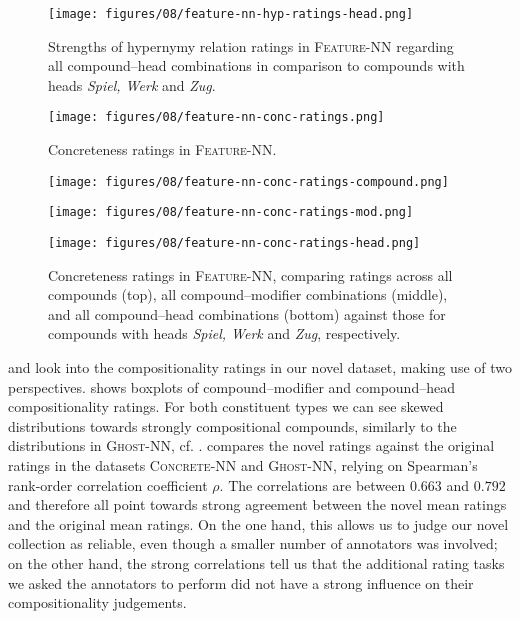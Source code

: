 \documentclass[output=paper,colorlinks,citecolor=brown]{langscibook}
\begin{document}
\begin{figure}[p]
    \centering
    \texttt{[image: figures/08/feature-nn-hyp-ratings-head.png]}
    \caption{Strengths of hypernymy relation ratings in \textsc{Feature-NN} regarding all compound--head combinations in comparison to compounds with heads \textit{Spiel, Werk} and \textit{Zug}.}
    \label{fig:feature-nn-ratings-hyp}
\end{figure}

\begin{figure}[p]
    \centering
    \texttt{[image: figures/08/feature-nn-conc-ratings.png]}
    \caption{Concreteness ratings in \textsc{Feature-NN}.}
    \label{fig:feature-nn-ratings-conc}
\end{figure}

\begin{figure}
    \centering
    \texttt{[image: figures/08/feature-nn-conc-ratings-compound.png]}

    \texttt{[image: figures/08/feature-nn-conc-ratings-mod.png]}

    \texttt{[image: figures/08/feature-nn-conc-ratings-head.png]}

    \caption{Concreteness ratings in \textsc{Feature-NN}, comparing ratings across all compounds (top), all compound--modifier combinations (middle), and all compound--head combinations (bottom) against those for compounds with heads \textit{Spiel, Werk} and \textit{Zug}, respectively.}
    \label{fig:feature-nn-ratings-conc-ex}
\end{figure}

 and  look into the compositionality ratings in our novel dataset, making use of two perspectives.  shows boxplots of compound--modifier and compound--head compositionality ratings. For both constituent types we can see skewed distributions towards strongly compositional compounds, similarly to the distributions in \textsc{Ghost-NN}, cf. .  compares the novel ratings against the original ratings in the datasets \textsc{Concrete-NN} and \textsc{Ghost-NN}, relying on Spearman's rank-order correlation coefficient $\rho$. The correlations are between $0.663$ and $0.792$ and therefore all point towards strong agreement between the novel mean ratings and the original mean ratings. On the one hand, this allows us to judge our novel collection as reliable, even though a smaller number of annotators was involved; on the other hand, the strong correlations tell us that the additional rating tasks we asked the annotators to perform did not have a strong influence on their compositionality judgements.
\end{document}
